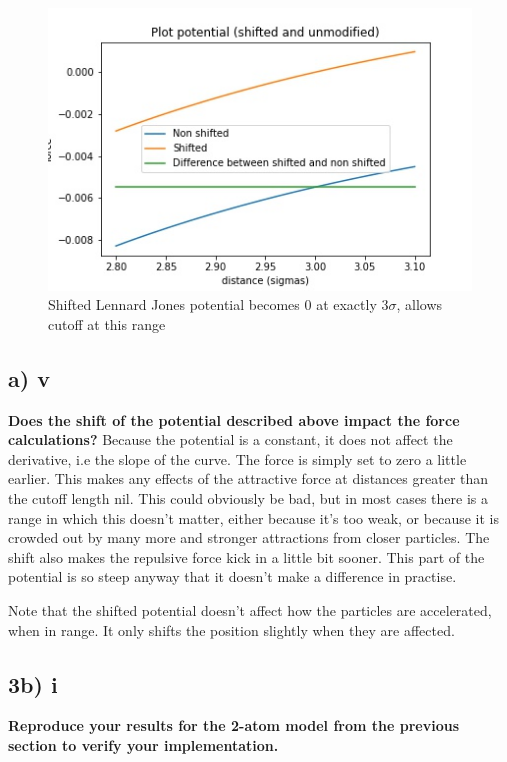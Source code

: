 \begin{figure}[h!]
        \centering 
        \includegraphics[scale=0.6]{./py/plotPotentialDiff.jpg} 
        \caption{Shifted  Lennard Jones  potential becomes 0 at exactly $3\sigma$, allows cutoff at this range }
        \label{fig:eksempelbilde1}
\end{figure}

\subsection*{a) v}
\textbf{Does the shift of the potential described above impact the force calculations?}
Because the potential is a constant, it does not affect the derivative, i.e the slope of the curve. The force is simply set to zero a little earlier. This makes any effects of the attractive force at distances greater than the cutoff length nil. This could obviously be bad, but in most cases there is a range in which this doesn't matter, either because it's too weak, or because it is crowded out by many more and stronger attractions from closer particles. The shift also makes the repulsive force kick in a little bit sooner. This part of the potential is so steep anyway that it doesn't make a difference in practise. 

Note that the shifted potential doesn't affect how the particles are accelerated, when in range. It only shifts the position slightly when they are affected.


\subsection*{3b) i}
\textbf{Reproduce your results for the 2-atom model from the previous section to verify your implementation.}

